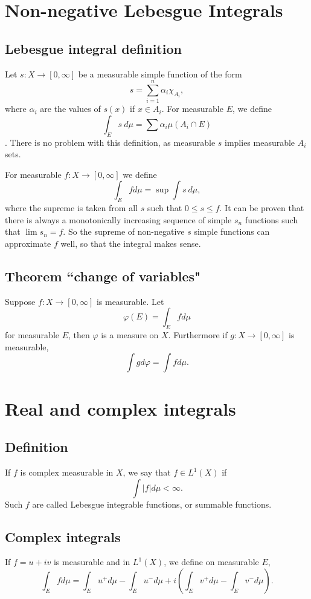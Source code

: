 \documentclass[oneside]{book}
\begin{document}
\section{Non-negative Lebesgue Integrals}

\subsection{Lebesgue integral definition}
Let $s:X\rightarrow [0,\infty]$ be a measurable simple
function of the form
$$s=\sum_{i=1}^{n}\alpha_i\chi_{A_i},$$
where $\alpha_i$ are the values of $s(x)$ if $x\in A_i$.
For measurable $E$, we define
$$\int_E s\ d\mu = \sum\alpha_i\mu(A_i\cap E)$$.
There is no problem with this definition, as measurable $s$
implies measurable $A_i$ sets.

For measurable $f:X\rightarrow [0,\infty]$ we define
$$\int_E f d\mu = \sup \int s\ d\mu,$$
where the supreme is taken from all $s$ such that
$0\leq s\leq f$. It can be proven that there is always
a monotonically increasing sequence of simple $s_n$ functions
such that $\lim s_n = f$. So the supreme of non-negative
$s$ simple functions can approximate $f$ well, so that
the integral makes sense.

\subsection{Theorem ``change of variables"}
Suppose $f:X\rightarrow [0,\infty]$ is measurable.
Let
$$\varphi(E) = \int_E fd\mu$$
for measurable $E$, then $\varphi$ is a measure on $X$.
Furthermore if $g:X\rightarrow[0,\infty]$ is measurable,
$$\int gd\varphi = \int fd\mu.$$


\section{Real and complex integrals}

\subsection{Definition}
If $f$ is complex measurable in $X$, we say that $f\in L^1(X)$
if
$$\int |f| d\mu < \infty.$$
Such $f$ are called Lebesgue integrable functions, or
summable functions.

\subsection{Complex integrals}
If $f=u+iv$ is measurable and in $L^1(X)$, we define on 
measurable $E$,
$$\int_E fd\mu = \int_E u^+d\mu-\int_Eu^-d\mu +i\left(
    \int_E v^+d\mu -\int_E v^-d\mu
\right).$$
\end{document}
